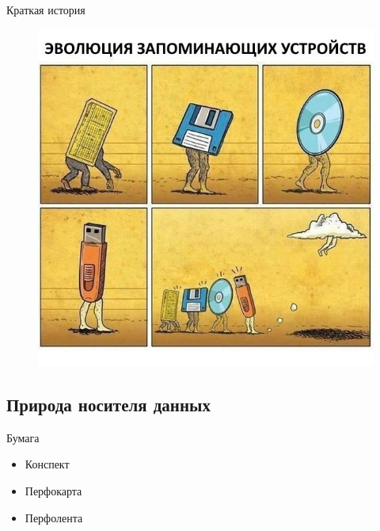 \documentclass[xetex,aspectratio=43]{beamer}
\begin{document}
\begin{frame}{Краткая история}
    \begin{figure}
        \includegraphics[height=0.8\textheight]{img/10.evo.jpg}
    \end{figure}
\end{frame}

\subsection{Природа носителя данных}

\begin{frame}{Бумага}

\begin{itemize}
\tightlist
\item
  Конспект
\item
  Перфокарта
\item
  Перфолента

\end{itemize}
\end{frame}
\end{document}
